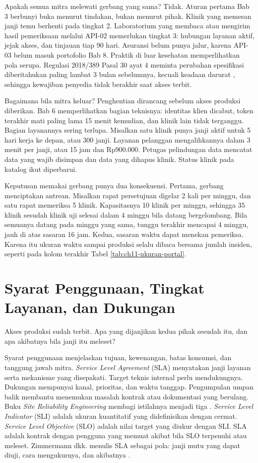 Apakah semua mitra melewati gerbang yang sama? Tidak. Aturan pertama Bab 3 berbunyi buka menurut tindakan, bukan menurut pihak. Klinik yang
memesan janji temu berhenti pada tingkat 2. Laboratorium yang membaca atau mengirim hasil pemeriksaan melalui API-02 memerlukan tingkat 3:
hubungan layanan aktif, jejak akses, dan tinjauan tiap 90 hari. Asuransi belum punya jalur, karena API-03 belum masuk portofolio Bab 8.
Praktik di luar kesehatan memperlihatkan pola serupa. Regulasi 2018/389 Pasal 30 ayat 4 meminta perubahan spesifikasi diberitahukan paling
lambat 3 bulan sebelumnya, kecuali keadaan darurat \cite{rts2018}, sehingga kewajiban penyedia tidak berakhir saat akses terbit.

Bagaimana bila mitra keluar? Penghentian dirancang sebelum akses produksi diberikan. Bab 6 memperlihatkan bagian teknisnya: identitas klien
dicabut, token terakhir mati paling lama 15 menit kemudian, dan klinik lain tidak terganggu. Bagian layanannya sering terlupa. Misalkan satu
klinik punya janji aktif untuk 5 hari kerja ke depan, atau 300 janji. Layanan pelanggan mengalihkannya dalam 3 menit per janji, atau 15 jam
dan Rp900.000. Petugas pelindungan data mencatat data yang wajib disimpan dan data yang dihapus klinik. Status klinik pada katalog ikut diperbarui.

Keputusan memakai gerbang punya dua konsekuensi. Pertama, gerbang menciptakan antrean. Misalkan rapat persetujuan digelar 2 kali per minggu, dan
satu rapat memeriksa 5 klinik. Kapasitasnya 10 klinik per minggu, sehingga 35 klinik sesudah klinik uji selesai dalam 4 minggu bila datang
bergelombang. Bila semuanya datang pada minggu yang sama, tunggu terakhir mencapai 4 minggu, jauh di atas sasaran 16 jam. Kedua, sasaran
waktu dapat menekan pemeriksa. Karena itu ukuran waktu sampai produksi selalu dibaca bersama jumlah insiden, seperti pada kolom terakhir Tabel
\ref{tab:ch11-ukuran-portal}.

\section{Syarat Penggunaan, Tingkat Layanan, dan Dukungan}

Akses produksi sudah terbit. Apa yang dijanjikan kedua pihak sesudah itu, dan apa akibatnya bila janji itu meleset?

Syarat penggunaan menjelaskan tujuan, kewenangan, batas konsumsi, dan tanggung jawab mitra. \textit{Service Level Agreement} (SLA) menyatakan
janji layanan serta mekanisme yang disepakati. Target teknis internal perlu mendukungnya. Dukungan mempunyai kanal, prioritas, dan waktu tanggap.
Pengumpulan umpan balik membantu menemukan masalah kontrak atau dokumentasi yang berulang. Buku \textit{Site Reliability Engineering} membagi
istilahnya menjadi tiga \cite{c11-sre-slo}. \textit{Service Level Indicator} (SLI) adalah ukuran kuantitatif yang didefinisikan dengan cermat.
\textit{Service Level Objective} (SLO) adalah nilai target yang diukur dengan SLI. SLA adalah kontrak dengan pengguna yang memuat akibat bila SLO
terpenuhi atau meleset. Zimmermann dkk. menulis SLA sebagai pola: janji mutu yang dapat diuji, cara mengukurnya, dan akibatnya
\cite{zimmermann2022patterns}.

